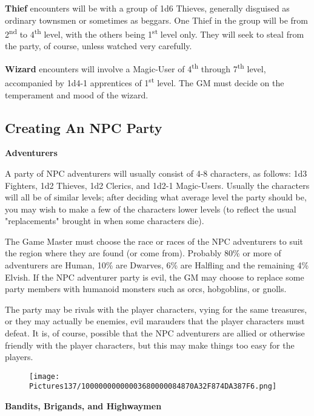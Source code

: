 \documentclass[a4paper,twoside,openany,10pt]{book}
\begin{document}
\begin{multicols}{2}
\textbf{Thief} encounters will be with a group of 1d6 Thieves, generally disguised as ordinary townsmen or sometimes as beggars. One Thief in the group will be from 2\textsuperscript{nd} to 4\textsuperscript{th} level, with the others being 1\textsuperscript{st} level only. They will seek to steal from the party, of course, unless watched very carefully. 

\textbf{Wizard }encounters will involve a Magic-User of 4\textsuperscript{th} through 7\textsuperscript{th} level, accompanied by 1d4-1 apprentices of 1\textsuperscript{st} level. The GM must decide on the temperament and mood of the wizard.

\subsection{Creating An NPC Party}\label{creating-an-npc-party}

\textbf{Adventurers}

A party of NPC adventurers will usually consist of 4-8 characters, as follows: 1d3 Fighters, 1d2 Thieves, 1d2 Clerics, and 1d2-1 Magic-Users. Usually the characters will all be of similar levels; after deciding what average level the party should be, you may wish to make a few of the characters lower levels (to reflect the usual "replacements" brought in when some characters die).

The Game Master must choose the race or races of the NPC adventurers to suit the region where they are found (or come from). Probably 80\% or more of adventurers are Human, 10\% are Dwarves, 6\% are Halfling and the remaining 4\% Elvish. If the NPC adventurer party is evil, the GM may choose to replace some party members with humanoid monsters such as orcs, hobgoblins, or gnolls.

The party may be rivals with the player characters, vying for the same treasures, or they may actually be enemies, evil marauders that the player characters must defeat. It is, of course, possible that the NPC adventurers are allied or otherwise friendly with the player characters, but this may make things too easy for the players.

\begin{wrapfigure}{r}{0.25\textwidth}
	\texttt{[image: Pictures137/10000000000003680000084870A32F874DA387F6.png]} 
\end{wrapfigure}

\textbf{Bandits, Brigands, and Highwaymen}


\end{multicols}
\end{document}
